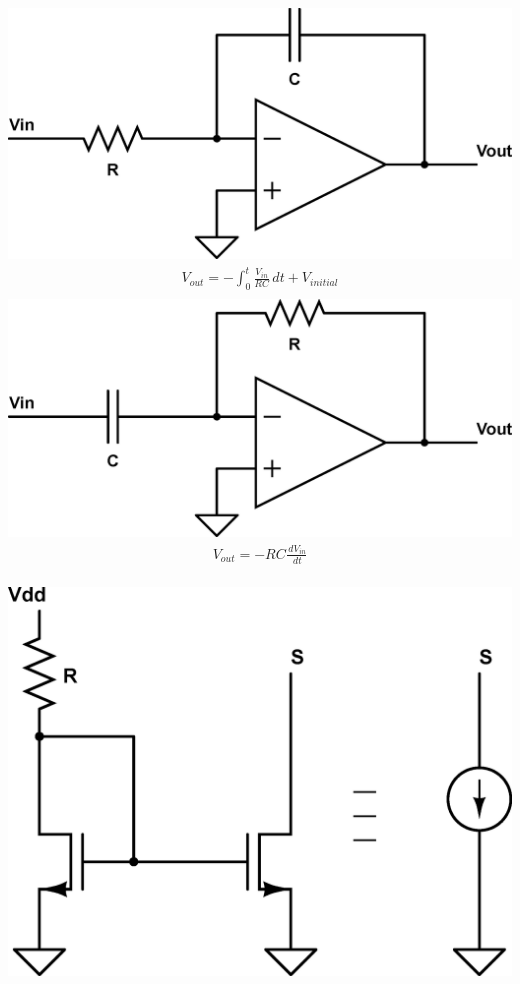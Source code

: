 \documentclass[10pt,letterpaper,english]{article}
\begin{document}
\begin{multicols}{2}
\includegraphics[scale=0.2]{opamp-integrator.eps}
\begin{align*}
V_{out} = -\int_0^t \frac{V_{in}}{RC} \,dt + V_{initial} \tag*{Integrator / Low-pass}\\
\end{align*}
\includegraphics[scale=0.2]{opamp-differentiator.eps}
\begin{align*}
V_{out} = -RC \frac{\,dV_{in}}{\,dt} \tag*{Differentiator / High-pass}\\
\end{align*}
\end{multicols}


\begin{multicols}{2}
\includegraphics[scale=0.2]{mosfet-current-mirror.eps}
\begin{align*}
\tag*{Mosfet current mirror circuit}\\
\end{align*}
\end{multicols}
\end{document}
